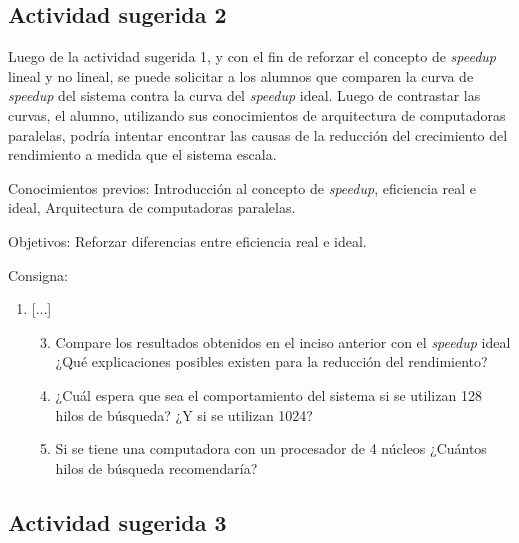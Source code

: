 \subsection{Actividad sugerida 2}

Luego de la actividad sugerida 1, y con el fin de reforzar el concepto de
\emph{speedup} lineal y no lineal, se puede solicitar a los alumnos que comparen
la curva de \emph{speedup} del sistema contra la curva del \emph{speedup} ideal.
Luego de contrastar las curvas, el alumno, utilizando sus conocimientos de
arquitectura de computadoras paralelas, podría intentar encontrar las causas de
la reducción del crecimiento del rendimiento a medida que el sistema escala.

\begin{description}

	\item{Conocimientos previos}: Introducción al concepto de
		\emph{speedup}, eficiencia real e ideal, Arquitectura de
		computadoras paralelas.

	\item{Objetivos}: Reforzar diferencias entre eficiencia real e ideal.

	\item{Consigna}: \begin{enumerate}

	\item{[...]

\begin{enumerate}

	\setcounter{enumii}{2}

	\item{Compare los resultados obtenidos en el inciso anterior con el
		\emph{speedup} ideal ¿Qué explicaciones posibles existen para la
		reducción del rendimiento?}

	\item{¿Cuál espera que sea el comportamiento del sistema si se utilizan
		128 hilos de búsqueda? ¿Y si se utilizan 1024?}

	\item{Si se tiene una computadora con un procesador de 4 núcleos
		¿Cuántos hilos de búsqueda recomendaría?}

\end{enumerate}}

\end{enumerate}

\end{description}

\subsection{Actividad sugerida 3}

